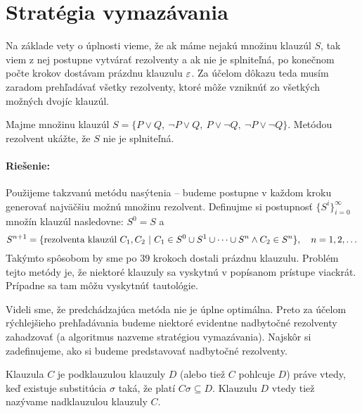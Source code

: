 \section{Stratégia vymazávania}

Na základe vety o úplnosti vieme, že ak máme nejakú množinu klauzúl $S$,
tak viem z nej postupne vytvárať rezolventy a ak nie je splniteľná, 
po konečnom počte krokov dostávam prázdnu klauzulu $\varepsilon$.
Za účelom dôkazu teda musím zaradom prehľadávať všetky rezolventy, ktoré
môže vzniknúť zo všetkých možných dvojíc klauzúl.

\begin{priklad}
    \label{prikl:vymazavanie}
    Majme množinu klauzúl $S=\{P\lor Q,\ \neg P\lor Q,\ 
        P \lor \neg Q,\ \neg P \lor \neg Q\}$. 
    Metódou rezolvent ukážte, že $S$ nie je splniteľná.

    \paragraph{Riešenie:}
    Použijeme takzvanú metódu nasýtenia -- budeme postupne 
    v každom kroku generovať najväčšiu možnú množinu rezolvent.
    Definujme si postupnosť $\{S^i\}_{i=0}^\infty$ množín klauzúl nasledovne:
    $S^0 = S$ a
    \begin{equation*}
        S^{n+1} = \{ \mbox{rezolventa klauzúl } C_1, C_2\ | \
            C_1 \in S^0 \cup S^1 \cup \cdots \cup S^{n} \land
            C_2 \in S^n\},\quad n=1, 2, \dots
    \end{equation*}
    Takýmto spôsobom by sme po $39$ krokoch dostali prázdnu klauzulu.
    Problém tejto metódy je, že niektoré klauzuly sa vyskytnú v
    popísanom prístupe viackrát. Prípadne sa tam môžu vyskytnúť tautológie.
\end{priklad}

Videli sme, že predchádzajúca metóda nie je úplne optimálna. Preto za
účelom rýchlejšieho prehľadávania budeme niektoré evidentne nadbytočné
rezolventy zahadzovať (a algoritmus nazveme stratégiou vymazávania).
Najskôr si zadefinujeme, ako si budeme predstavovať nadbytočné rezolventy.

\begin{definicia}[podklauzula]
    Klauzula $C$ je podklauzulou klauzuly $D$ (alebo tiež $C$ pohlcuje
    $D$) práve vtedy, keď existuje substitúcia $\sigma$ taká, že platí $C\sigma
    \subseteq D$. Klauzulu $D$ vtedy tiež nazývame nadklauzulou klauzuly $C$.
\end{definicia}

